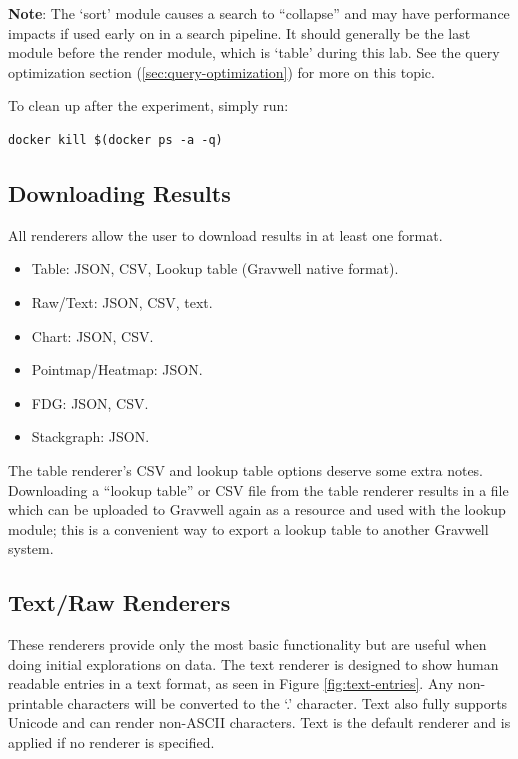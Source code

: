\textbf{Note}: The `sort' module causes a search to ``collapse'' and may have
performance impacts if used early on in a search pipeline. It should
generally be the last module before the render module, which is `table'
during this lab. See the query optimization section (\ref{sec:query-optimization}) for more on this topic.

To clean up after the experiment, simply run:

\begin{Verbatim}[breaklines=true]
docker kill $(docker ps -a -q)
\end{Verbatim}


\subsection{Downloading Results}
All renderers allow the user to download results in at least one
format.

\begin{itemize}
\item
  Table: JSON, CSV, Lookup table (Gravwell native format).
\item
  Raw/Text: JSON, CSV, text.
\item
  Chart: JSON, CSV.
\item
  Pointmap/Heatmap: JSON.
\item
  FDG: JSON, CSV.
\item
  Stackgraph: JSON.
\end{itemize}

The table renderer's CSV and lookup table options deserve some extra notes.
Downloading a ``lookup table'' or CSV file
from the table renderer results in a file which can be uploaded to
Gravwell again as a resource and used with the lookup module; this is a
convenient way to export a lookup table to another Gravwell system.


\subsection{Text/Raw Renderers}
These renderers provide only the most basic functionality but are
useful when doing initial explorations on data. The text renderer is
designed to show human readable entries in a text format, as seen in Figure \ref{fig:text-entries}. Any
non-printable characters will be converted to the `.' character. Text
also fully supports Unicode and can render non-ASCII characters. Text is
the default renderer and is applied if no renderer is specified.

